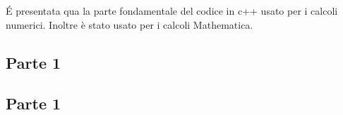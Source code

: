 \'E presentata qua la parte fondamentale del codice in c++ usato per i calcoli numerici. Inoltre è stato usato per i calcoli Mathematica.

\subsection{Parte 1}







\subsection{Parte 1}






